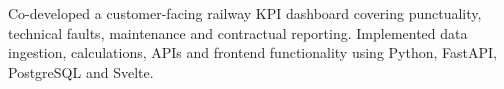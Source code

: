 Co-developed a customer-facing railway KPI dashboard covering punctuality, technical faults, maintenance and contractual reporting. Implemented data ingestion, calculations, APIs and frontend functionality using Python, FastAPI, PostgreSQL and Svelte.

